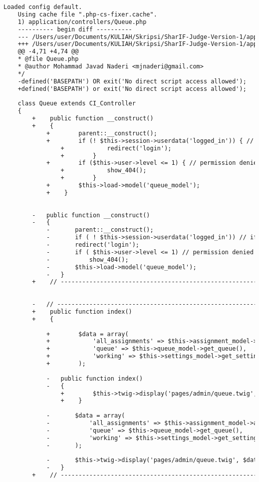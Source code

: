 \begin{lstlisting}[language=diff, caption=Perubahan pada kode Queue.php]
	Loaded config default.
	Using cache file ".php-cs-fixer.cache".
	1) application/controllers/Queue.php
	---------- begin diff ----------
	--- /Users/user/Documents/KULIAH/Skripsi/SharIF-Judge-Version-1/application/controllers/Queue.php
	+++ /Users/user/Documents/KULIAH/Skripsi/SharIF-Judge-Version-1/application/controllers/Queue.php
	@@ -4,71 +4,74 @@
	* @file Queue.php
	* @author Mohammad Javad Naderi <mjnaderi@gmail.com>
	*/
	-defined('BASEPATH') OR exit('No direct script access allowed');
	+defined('BASEPATH') or exit('No direct script access allowed');
	
	class Queue extends CI_Controller
	{
		+    public function __construct()
		+    {
			+        parent::__construct();
			+        if (! $this->session->userdata('logged_in')) { // if not logged in
				+            redirect('login');
				+        }
			+        if ($this->user->level <= 1) { // permission denied
				+            show_404();
				+        }
			+        $this->load->model('queue_model');
			+    }
		
		
		-	public function __construct()
		-	{
			-		parent::__construct();
			-		if ( ! $this->session->userdata('logged_in')) // if not logged in
			-		redirect('login');
			-		if ( $this->user->level <= 1) // permission denied
			-			show_404();
			-		$this->load->model('queue_model');
			-	}
		+    // ------------------------------------------------------------------------
		
		
		-	// ------------------------------------------------------------------------
		+    public function index()
		+    {
			
			+        $data = array(
			+            'all_assignments' => $this->assignment_model->all_assignments(),
			+            'queue' => $this->queue_model->get_queue(),
			+            'working' => $this->settings_model->get_setting('queue_is_working')
			+        );
			
			-	public function index()
			-	{
				+        $this->twig->display('pages/admin/queue.twig', $data);
				+    }
			
			-		$data = array(
			-			'all_assignments' => $this->assignment_model->all_assignments(),
			-			'queue' => $this->queue_model->get_queue(),
			-			'working' => $this->settings_model->get_setting('queue_is_working')
			-		);
			
			-		$this->twig->display('pages/admin/queue.twig', $data);
			-	}
		+    // ------------------------------------------------------------------------
		

\end{lstlisting}
